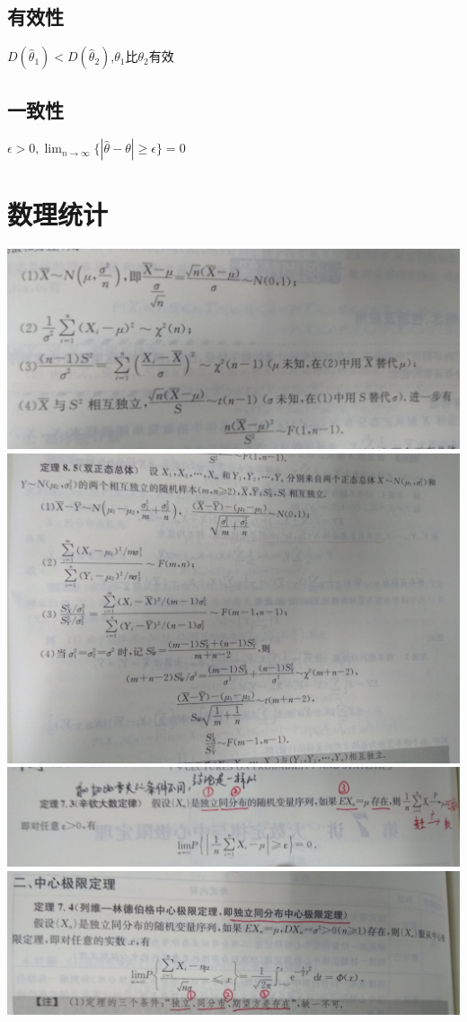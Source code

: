 \documentclass[UTF8]{ctexart}
\begin{document}
\subsection{有效性}
$D(\hat{\theta}_1)<D(\hat{\theta}_2)$,$\theta_1$比$\theta_2$有效
\subsection{一致性}
$\epsilon>0 ,\lim_{n \rightarrow \infty} \{| \hat{\theta} -\theta | \geq \epsilon \} =0$

\section{数理统计}

\includegraphics[width=15cm]{9345E7/danzhengtai.jpg}
\includegraphics[width=15cm]{9345E7/shuangzhengtai.jpg}
\includegraphics[width=15cm]{9345E7/xinqin.jpg}
\includegraphics[width=15cm]{9345E7/zhongxinjixian.jpg}
\end{document}
